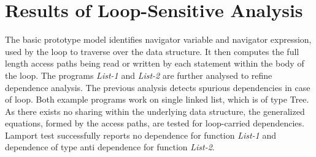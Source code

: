 \section{Results of Loop-Sensitive Analysis}
The basic prototype model identifies navigator variable and 
navigator expression, used by the loop to traverse over the 
data structure. It then computes the full length access paths 
being read or written by each statement within the body of the loop. 
The programs \emph{List-1} and \emph{List-2} are further analysed to refine dependence analysis. 
The previous analysis detects spurious dependencies in case of loop. 
Both example programs work on 
single linked list, which is of type Tree. As there exists no 
sharing within the underlying data structure, the generalized 
equations, formed by the access paths, are tested for loop-carried 
dependencies. Lamport test successfully reports no dependence for 
function \emph{List-1} and dependence of type 
anti dependence for function \emph{List-2}. 




